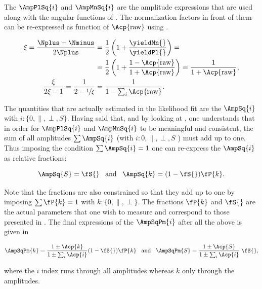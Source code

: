 \noindent The $\AmpPlSq{i}$ and $\AmpMnSq{i}$ are the amplitude expressions that are used along with the angular functions of .
The normalization factors in front of them can be re-expressed as function of $\Acp{\text{raw}}$ using .

\begin{align}
\xi = \frac{\Nplus+\Nminus}{2\Nplus} &= \frac{1}{2}\left( 1 + \frac{\yieldMn{}}{\yieldPl{}}\right) = \nonumber \\
                                     &= \frac{1}{2}\left( 1 + \frac{1-\Acp{\text{raw}}}{1+\Acp{\text{raw}}}\right) =
                                        \frac{1}{1+\Acp{\text{raw}}},  \\
\frac{\xi}{2\xi-1} = \frac{1}{2-\nicefrac{1}{\xi}} &= \frac{1}{1-\sum_i\Acp{\text{raw}}}.
\label{amp_norms}
\end{align}

The quantities that are actually estimated in the likelihood fit are the $\AmpSq{i}$ with $i:\{0,\parallel,\perp,S\}$.
Having said that, and by looking at , one understands that in order for $\AmpPlSq{i}$ and $\AmpMnSq{i}$
to be meaningful and consistent, the sum of all amplitudes $\sum\AmpSq{i}$ (with $i:{0,\parallel,\perp,S}$ ) must add up to one.
Thus imposing the condition $\sum\AmpSq{i} = 1$ one can re-express the $\AmpSq{i}$ as relative fractions:

\begin{equation}
\AmpSq{S} = \fS{} \;\;\;\text{and}\;\;\; \AmpSq{k} = (1-\fS{})\fP{k}.
\label{amps_param}
\end{equation}

Note that the \pwave fractions are also constrained so that they add up to one by imposing $\sum\fP{k}=1$ with $k:\{0,\parallel,\perp\}$.
The fractions $\fP{k}$ and $\fS{}$ are the actual parameters that one wish to measure and correspond to those presented in .
The final expressions of the $\AmpSqPm{i}$ after all the above is given in 

\begin{equation}
\AmpSqPm{k} = \frac{1\pm\Acp{k}}{1\pm\sum_i\Acp{i}}  (1-\fS{})\fP{k}  \;\;\; \text{and}\;\;\; \AmpSqPm{S} = \frac{1\pm\Acp{S}}{1\pm\sum_i\Acp{i}} \; \fS{},
\label{amps_final}
\end{equation}

\noindent where the $i$ index runs through all amplitudes whereas $k$ only through the \pwave amplitudes.

